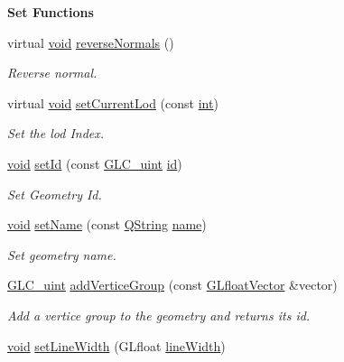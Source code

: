 \begin{Indent}{\bf Set Functions}
\begin{DoxyCompactItemize}
virtual \hyperlink{group___u_a_v_objects_plugin_ga444cf2ff3f0ecbe028adce838d373f5c}{void} \hyperlink{class_g_l_c___geometry_a56656f1e8a767a4d5ce61291e98636a9}{reverse\-Normals} ()
\begin{DoxyCompactList}\small\item\em Reverse normal. \end{DoxyCompactList}\item 
virtual \hyperlink{group___u_a_v_objects_plugin_ga444cf2ff3f0ecbe028adce838d373f5c}{void} \hyperlink{class_g_l_c___geometry_ad0d02204258f8b747ad8f2e18b04a476}{set\-Current\-Lod} (const \hyperlink{ioapi_8h_a787fa3cf048117ba7123753c1e74fcd6}{int})
\begin{DoxyCompactList}\small\item\em Set the lod Index. \end{DoxyCompactList}\item 
\hyperlink{group___u_a_v_objects_plugin_ga444cf2ff3f0ecbe028adce838d373f5c}{void} \hyperlink{class_g_l_c___geometry_a6a95d8141931f75f6ff24da9ea7afc2a}{set\-Id} (const \hyperlink{glc__global_8h_abf950976fabed69026558df8e2da6c6b}{G\-L\-C\-\_\-uint} \hyperlink{glext_8h_a58c2a664503e14ffb8f21012aabff3e9}{id})
\begin{DoxyCompactList}\small\item\em Set Geometry Id. \end{DoxyCompactList}\item 
\hyperlink{group___u_a_v_objects_plugin_ga444cf2ff3f0ecbe028adce838d373f5c}{void} \hyperlink{class_g_l_c___geometry_aae3d9dc6b80dd36c2654ca8d0cc868ec}{set\-Name} (const \hyperlink{group___u_a_v_objects_plugin_gab9d252f49c333c94a72f97ce3105a32d}{Q\-String} \hyperlink{glext_8h_ad977737dfc9a274a62741b9500c49a32}{name})
\begin{DoxyCompactList}\small\item\em Set geometry name. \end{DoxyCompactList}\item 
\hyperlink{glc__global_8h_abf950976fabed69026558df8e2da6c6b}{G\-L\-C\-\_\-uint} \hyperlink{class_g_l_c___geometry_ace9a3e4677aa6bfea6703a36967cd526}{add\-Vertice\-Group} (const \hyperlink{glc__global_8h_a9f3f0b00cd127b066c9931b9c257a046}{G\-Lfloat\-Vector} \&vector)
\begin{DoxyCompactList}\small\item\em Add a vertice group to the geometry and returns its id. \end{DoxyCompactList}\item 
\hyperlink{group___u_a_v_objects_plugin_ga444cf2ff3f0ecbe028adce838d373f5c}{void} \hyperlink{class_g_l_c___geometry_af839387fb295abbc592c0dfb341210d8}{set\-Line\-Width} (G\-Lfloat \hyperlink{class_g_l_c___geometry_a04b010db25b8ffa3f1837cf5859644ec}{line\-Width})

\end{DoxyCompactItemize}
\end{Indent}

